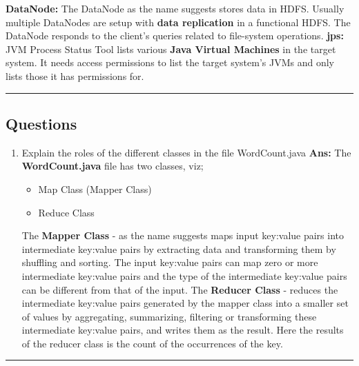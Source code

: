 \documentclass[12pt]{article}
\begin{document}
\begin{enumerate}
    \textbf{DataNode:}
    \newline
    	The DataNode as the name suggests stores data in HDFS. Usually multiple DataNodes are setup with \textbf{data replication} in a functional HDFS. The DataNode responds to the client's queries related to file-system operations.\cite{DN}
	\newline
    \newline
    \textbf{jps:}
    \newline
    	JVM Process Status Tool lists various \textbf{Java Virtual Machines} in the target system. It needs access permissions to list the target system's JVMs and only lists those it has permissions for.\cite{JPS}
\end{enumerate}
\hrule
\subsection{Questions}
\begin{enumerate}
\item  Explain the roles of the different classes in the file WordCount.java
\newline
\newline
\textbf{Ans:}
	\newline
    	The \textbf{WordCount.java} file has two classes, viz;
        \begin{itemize}
        \item Map Class (Mapper Class)
        \item Reduce Class
        \end{itemize}
    	The \textbf{Mapper Class} - as the name suggests maps input key:value pairs into intermediate key:value pairs by extracting data and transforming them by shuffling and sorting. The input key:value pairs can map zero or more intermediate key:value pairs and the type of the intermediate key:value pairs can be different from that of the input.\cite{MC}
    \newline
    \newline
    	The \textbf{Reducer Class} - reduces the intermediate key:value pairs generated by the mapper class into a smaller set of values by aggregating, summarizing, filtering or transforming these intermediate key:value pairs, and writes them as the result.
        Here the results of the reducer class is the count of the occurrences of the key.\cite{RC}
\end{enumerate}
\hrule
\end{document}
